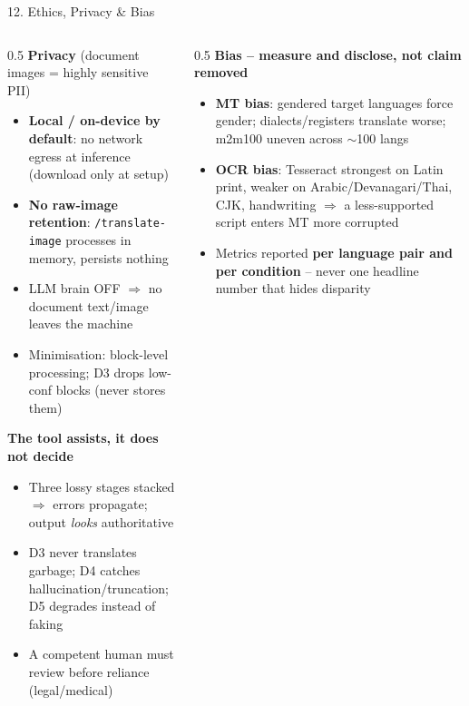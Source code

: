 \documentclass[10pt,aspectratio=169]{beamer}
\begin{document}
\begin{frame}{12. Ethics, Privacy \& Bias}
\begin{columns}[T]
\begin{column}{0.5\textwidth}
\textbf{Privacy} {\scriptsize(document images = highly sensitive PII)}
\begin{itemize}\scriptsize
  \item \textbf{Local / on-device by default}: no network egress at inference (download only at setup)
  \item \textbf{No raw-image retention}: \texttt{/translate-image} processes in memory, persists nothing
  \item LLM brain OFF $\Rightarrow$ no document text/image leaves the machine
  \item Minimisation: block-level processing; D3 drops low-conf blocks (never stores them)
\end{itemize}

\textbf{The tool assists, it does not decide}
\begin{itemize}\scriptsize
  \item Three lossy stages stacked $\Rightarrow$ errors propagate; output \emph{looks} authoritative
  \item D3 never translates garbage; D4 catches hallucination/truncation; D5 degrades instead of faking
  \item A competent human must review before reliance (legal/medical)
\end{itemize}
\end{column}
\begin{column}{0.5\textwidth}
\textbf{Bias -- measure and disclose, not claim removed}
\begin{itemize}\scriptsize
  \item \textbf{MT bias}: gendered target languages force gender; dialects/registers translate worse; m2m100 uneven across $\sim$100 langs
  \item \textbf{OCR bias}: Tesseract strongest on Latin print, weaker on Arabic/Devanagari/Thai, CJK, handwriting $\Rightarrow$ a less-supported script enters MT more corrupted
  \item Metrics reported \textbf{per language pair and per condition} -- never one headline number that hides disparity
\end{itemize}


\end{column}
\end{columns}
\end{frame}
\end{document}
